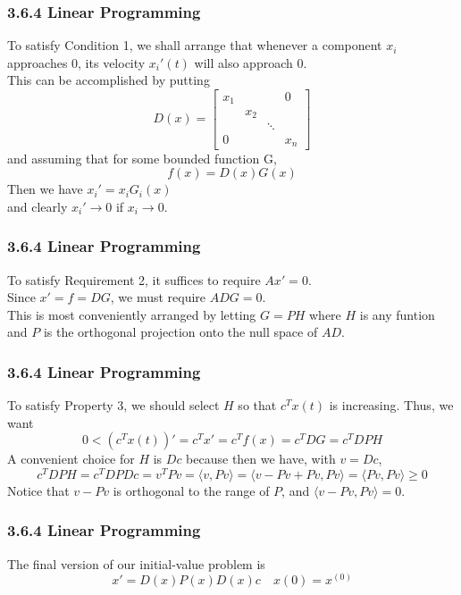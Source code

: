 \documentclass[notheorems,mathserif,table,compress]{beamer}  %
\begin{document}
\begin{frame}
  \frametitle{3.6.4 Linear Programming}
  To satisfy Condition 1, we shall arrange that whenever a component $x_i$ approaches 0, its velocity $x_i'(t)$ will also approach 0.\\ 
  This can be accomplished by putting
  \begin{displaymath}
  D(x)=
  \left[ \begin{array}{cccc}
  x_1 &     &        & 0 \\
      & x_2 &        &   \\
      &     & \ddots &   \\
   0  &     &        & x_n
  \end{array} \right]
  \end{displaymath}
  and assuming that for some bounded function G,
  \[ f(x)=D(x)G(x) \]
  Then we have $x_i'=x_iG_i(x)$ \\
  and clearly $x_i'\to 0$ if $x_i\to0$.
\end{frame}


\begin{frame}
  \frametitle{3.6.4 Linear Programming}
  To satisfy Requirement 2, it suffices to require $Ax'=0$. \\
  Since $x'=f=DG$, we must require $ADG=0$. \\
  This is most conveniently arranged by letting $G=PH$ where $H$ is any funtion and $P$ is the orthogonal projection onto the null space of $AD$.
\end{frame}


\begin{frame}
  \frametitle{3.6.4 Linear Programming}
  To satisfy Property 3, we should select $H$ so that $c^Tx(t)$ is increasing. Thus, we want
  \[ 0<(c^Tx(t))'=c^Tx'=c^Tf(x)=c^TDG=c^TDPH \]
  A convenient choice for $H$ is $Dc$ because then we have, with $v=Dc$,
  \[ c^TDPH=c^TDPDc=v^TPv=\langle v,Pv\rangle=\langle v-Pv+Pv,Pv\rangle=\langle Pv,Pv\rangle \ge0 \]
  Notice that $v-Pv$ is orthogonal to the range of $P$, and $\langle v-Pv,Pv\rangle=0$.
\end{frame}


\begin{frame}
  \frametitle{3.6.4 Linear Programming}
  The final version of our initial-value problem is
  \[ x'=D(x)P(x)D(x)c \quad x(0)=x^{(0)} \]
\end{frame}
\end{document}
